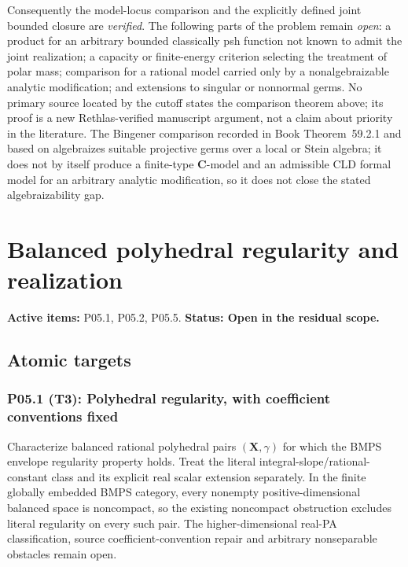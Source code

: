 \documentclass[11pt,a4paper]{article}
\theoremstyle{definition}
\theoremstyle{remark}
\begin{document}
Consequently the model-locus comparison and the explicitly defined joint
bounded closure are \emph{verified}.  The following parts of the problem
remain \emph{open}: a product for an arbitrary
bounded classically psh function not known to admit the joint realization; a
capacity or finite-energy criterion selecting the treatment of polar mass;
comparison for a rational model carried only by a nonalgebraizable analytic
modification; and extensions to singular or nonnormal germs.  No primary
source located by the cutoff states the comparison theorem above; its proof
is a new Rethlas-verified manuscript argument, not a claim about priority in
the literature.  The Bingener comparison recorded in
Book Theorem~59.2.1 and based on
\cite[Aussage~2.8]{Bingener76Stein} algebraizes suitable projective germs over
a local or Stein algebra; it does not by itself produce a finite-type
\(\mathbf C\)-model and an admissible CLD formal model for an arbitrary
analytic modification, so it does not close the stated algebraizability gap.

\clearpage\section{Balanced polyhedral regularity and realization}
\label{family:4}
\noindent\textbf{Active items:} P05.1, P05.2, P05.5. \textbf{Status: Open in the residual scope.}

\subsection{Atomic targets}
\subsubsection*{P05.1 (T3): Polyhedral regularity, with coefficient conventions fixed}
\label{atom:P05.1}
Characterize balanced rational polyhedral pairs \((\mathbf X,\gamma)\) for which the BMPS envelope regularity property holds. Treat the literal integral-slope/rational-constant class and its explicit real scalar extension separately. In the finite globally embedded BMPS category, every nonempty positive-dimensional balanced space is noncompact, so the existing noncompact obstruction excludes literal regularity on every such pair. The higher-dimensional real-PA classification, source coefficient-convention repair and arbitrary nonseparable obstacles remain open.
\end{document}
